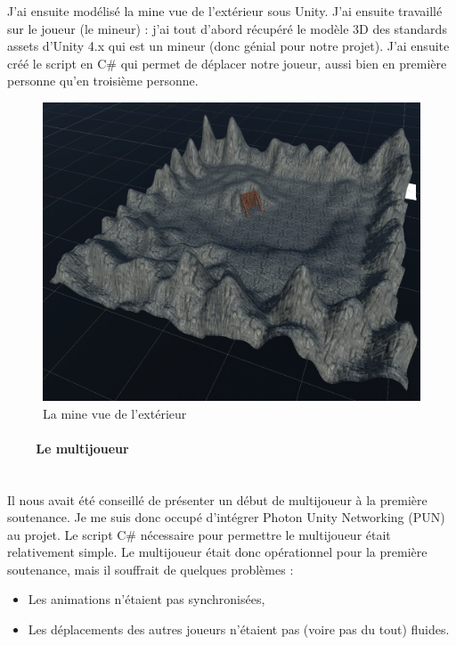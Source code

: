 \documentclass[titlepage, 13px, a4paper]{report}
\begin{document}
J’ai ensuite modélisé la mine vue de l’extérieur sous Unity.
J’ai ensuite travaillé sur le joueur (le mineur) : j’ai tout d’abord récupéré le modèle 3D des standards assets d’Unity 4.x 
qui est un mineur (donc génial pour notre projet). J’ai ensuite créé le script en C\# qui permet de déplacer 
notre joueur, aussi bien en première personne qu’en troisième personne. \\

\begin{figure}[h!]
  \centering
  \includegraphics[scale=0.3]{images/cedric_mine.png}
  \caption{La mine vue de l'extérieur}
\end{figure}

\paragraph{~~~~Le multijoueur} \hspace{0pt} \\
Il nous avait été conseillé de présenter un début de multijoueur à la première soutenance. 
Je me suis donc occupé d’intégrer Photon Unity Networking (PUN) au projet.
Le script C\# nécessaire pour permettre le multijoueur était relativement simple.
Le multijoueur était donc opérationnel pour la première soutenance, mais il souffrait de quelques problèmes : \\
{\begin{itemize}
	 \item Les animations n’étaient pas synchronisées,
	 \item Les déplacements des autres joueurs n’étaient pas (voire pas du tout) fluides. \\
\end{itemize}}
\end{document}
